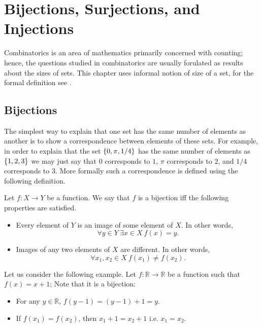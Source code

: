 \chapter{Bijections, Surjections, and Injections}
\label{chapter:bijections-surjections-injections}

Combinatorics is an area of mathematics primarily concerned with counting;
hence, the questions studied in combinatorics are usually forulated as results
about the sizes of sets. This chapter uses informal notion of size of a set, for
the formal definition see .
\section{Bijections}
The simplest way to explain that one set has the same number of elements as
another is to show a correspondence between elements of these sets. For example,
in order to explain that the set $\set{0, \pi, 1 / 4}$ has the same number of
elements as $\set{1, 2, 3}$ we may just say that $0$ corresponds to $1$,
$\pi$ corresponds to $2$, and $1 / 4$ corresponds to $3$. More formally such a
correspondence is defined using the following definition.
\begin{definition}
    Let $f : X \to Y$ be a function. We say that $f$ is a bijection iff the
    following properties are satisfied.
    \begin{itemize}
        \item Every element of $Y$ is an image of some element of $X$. In other
            words,
            \[
                \forall y \in Y~\exists x \in X\ f(x) = y.
            \]
        \item Images of any two elements
            of $X$ are different. In other words,
            \[
                \forall x_1, x_2 \in X\ f(x_1) \neq f(x_2).
            \]
    \end{itemize}
\end{definition}

Let us consider the following example. Let $f : \mathbb{R} \to \mathbb{R}$ be a
function such that $f(x) = x + 1$; Note that it is a bijection:
\begin{itemize}
    \item For any $y \in \mathbb{R}$, $f(y - 1) = (y - 1) + 1 = y$.
    \item If $f(x_1) = f(x_2)$, then $x_1 + 1 = x_2 + 1$ i.e. $x_1 = x_2$.
\end{itemize}

